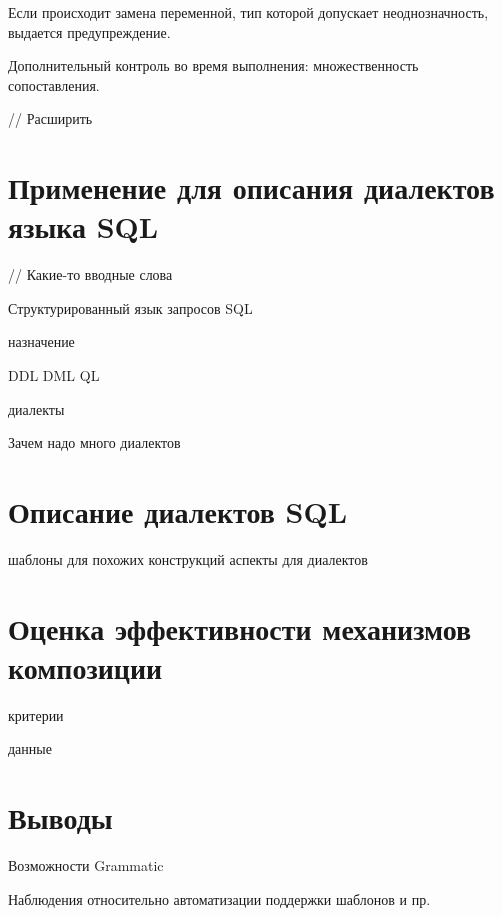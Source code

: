Если происходит замена переменной, тип которой допускает неоднозначность, выдается предупреждение.

Дополнительный контроль во время выполнения: множественность сопоставления. 

// Расширить
	

\chapter{Применение  для описания диалектов языка SQL}

// Какие-то вводные слова

Структурированный язык запросов SQL

назначение

DDL DML QL

диалекты

Зачем надо много диалектов

\chapter{Описание диалектов SQL}

шаблоны для похожих конструкций
аспекты для диалектов

\chapter{Оценка эффективности механизмов композиции }

критерии

данные

\chapter{Выводы}

Возможности Grammatic

Наблюдения относительно автоматизации поддержки шаблонов и пр.
